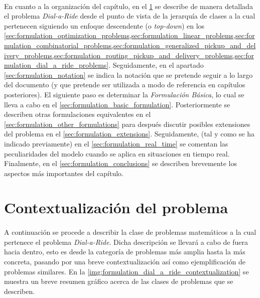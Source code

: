 \documentclass{subfiles}
\begin{document}
      \paragraph{}
      En cuanto a la organización del capítulo, en el \cref{sec:formulation_contextualization} se describe de manera detallada el problema \emph{Dial-a-Ride} desde el punto de vista de la jerarquía de clases a la cual pertenecen siguiendo un enfoque descendente (o \emph{top-down}) en los \cref{sec:formulation_optimization_problems,sec:formulation_linear_problems,sec:formulation_combinatorial_problems,sec:formulation_generalized_pickup_and_delivery_problems,sec:formulation_routing_pickup_and_delivery_problems,sec:formulation_dial_a_ride_problems}. Seguidamente, en el apartado \cref{sec:formulation_notation} se indica la notación que se pretende seguir a lo largo del documento (y que pretende ser utilizada a modo de referencia en capítulos posteriores). El siguiente paso es determinar la \emph{Formulación Básica}, lo cual se lleva a cabo en el \cref{sec:formulation_basic_formulation}. Posteriormente se describen otras formulaciones equivalentes en el \cref{sec:formulation_other_formulations} para después discutir posibles extensiones del problema en el \cref{sec:formulation_extensions}. Seguidamente, (tal y como se ha indicado previamente) en el \cref{sec:formulation_real_time} se comentan las peculiaridades del modelo cuando se aplica en situaciones en tiempo real. Finalmente, en el \cref{sec:formulation_conclusions} se describen brevemente los aspectos más importantes del capítulo.

    \section{Contextualización del problema}
    \label{sec:formulation_contextualization}

      \paragraph{}
      A continuación se procede a describir la clase de problemas matemáticos a la cual pertenece el problema \emph{Dial-a-Ride}. Dicha descripción se llevará a cabo de fuera hacia dentro, esto es desde la categoría de problemas más amplia hasta la más concreta, pasando por una breve contextualización así como ejemplificación de problemas similares. En la \cref{img:formulation_dial_a_ride_contextualization} se muestra un breve resumen gráfico acerca de las clases de problemas que se describen.
\end{document}
